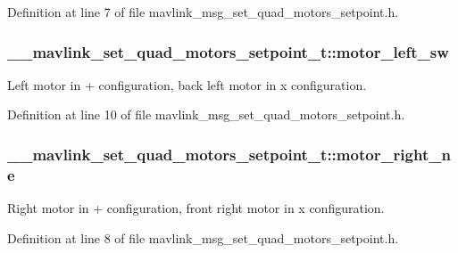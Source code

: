 Definition at line 7 of file mavlink\-\_\-msg\-\_\-set\-\_\-quad\-\_\-motors\-\_\-setpoint.\-h.

\hypertarget{struct____mavlink__set__quad__motors__setpoint__t_adf7327b8cd6bb3e73e6aaeaea75d639c}{
\subsubsection[{motor\-\_\-left\-\_\-sw}]{ \-\_\-\-\_\-mavlink\-\_\-set\-\_\-quad\-\_\-motors\-\_\-setpoint\-\_\-t\-::motor\-\_\-left\-\_\-sw}}\label{struct____mavlink__set__quad__motors__setpoint__t_adf7327b8cd6bb3e73e6aaeaea75d639c}


Left motor in + configuration, back left motor in x configuration. 



Definition at line 10 of file mavlink\-\_\-msg\-\_\-set\-\_\-quad\-\_\-motors\-\_\-setpoint.\-h.

\hypertarget{struct____mavlink__set__quad__motors__setpoint__t_add9189ea075924d28bb0a4c04c04fcee}{
\subsubsection[{motor\-\_\-right\-\_\-ne}]{ \-\_\-\-\_\-mavlink\-\_\-set\-\_\-quad\-\_\-motors\-\_\-setpoint\-\_\-t\-::motor\-\_\-right\-\_\-ne}}\label{struct____mavlink__set__quad__motors__setpoint__t_add9189ea075924d28bb0a4c04c04fcee}


Right motor in + configuration, front right motor in x configuration. 



Definition at line 8 of file mavlink\-\_\-msg\-\_\-set\-\_\-quad\-\_\-motors\-\_\-setpoint.\-h.

